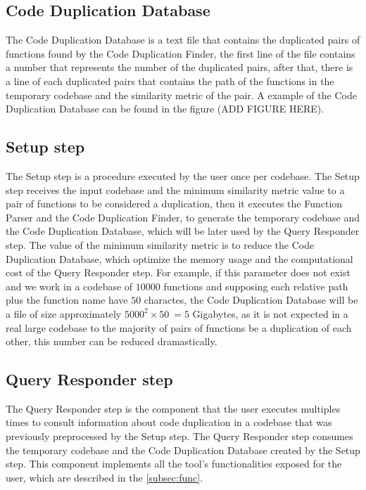 \subsection{Code Duplication Database}

The Code Duplication Database is a text file that contains the duplicated pairs of functions found by the Code Duplication Finder, 
the first line of the file contains a number that represents the number of the duplicated pairs, after that, there is 
a line of each duplicated pairs that contains the path of the functions in the temporary codebase and the similarity metric of the 
pair. A example of the Code Duplication Database can be found in the figure (ADD FIGURE HERE). 

\subsection{Setup step}

\label{subsec:setup}

The Setup step is a procedure executed by the user once per codebase. The Setup step receives the input codebase and the minimum
similarity metric value to a pair of functions to be considered a duplication, then it executes the Function Parser and the Code 
Duplication Finder, to generate the temporary codebase and the Code Duplication Database, which will be later used by the Query
Responder step. The value of the minimum similarity metric is to reduce the Code Duplication Database, which optimize the
memory usage and the computational cost of the Query Responder step. For example, if this parameter does not exist and we work in 
a codebase of $10000$ functions and supposing each relative path plus the function name have $50$ charactes, the Code Duplication 
Database will be a file of size approximately $5000^2 \times 50 ~= 5$ Gigabytes, as it is not expected in a real large codebase 
to the majority of pairs of functions be a duplication of each other, this number can be reduced dramastically.

\subsection{Query Responder step}

The Query Responder step is the component that the user executes multiples times to consult information about code duplication in
a codebase that was previously preprocessed by the Setup step. The Query Responder step consumes the temporary codebase and the 
Code Duplication Database created by the Setup step. This component implements all the tool's functionalities exposed 
for the user, which are described in the \ref{subsec:func}.


